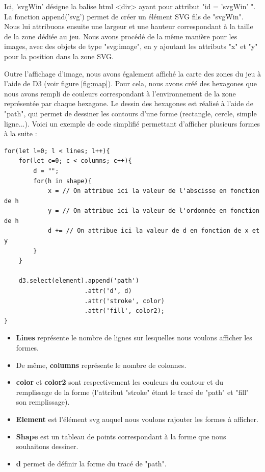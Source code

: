 \documentclass[12pt]{report}
\begin{document}
    Ici, 'svgWin' désigne la balise html \textless{}div\textgreater{} ayant pour attribut "id = 'svgWin' ". La fonction append('svg') permet de créer un élément SVG fils de "svgWin". Nous lui attribuons ensuite une largeur et une hauteur correspondant à la taille de la zone dédiée au jeu. Nous avons procédé de la même manière pour les images, avec des objets de type "svg:image", en y ajoutant les attributs "x" et "y" pour la position dans la zone SVG.

    Outre l'affichage d'image, nous avons également affiché la carte des zones du jeu à l'aide de D3 (voir figure \ref{fig:map}). Pour cela, nous avons créé des hexagones que nous avons rempli de couleurs correspondant à l'environnement de la zone représentée par chaque hexagone. Le dessin des hexagones est réalisé à l'aide de "path", qui permet de dessiner les contours d'une forme (rectangle, cercle, simple ligne...). Voici un exemple de code simplifié permettant d'afficher plusieurs formes à la suite :

	\begin{verbatim}
for(let l=0; l < lines; l++){
    for(let c=0; c < columns; c++){
        d = "";
        for(h in shape){
            x = // On attribue ici la valeur de l'abscisse en fonction de h
            y = // On attribue ici la valeur de l'ordonnée en fonction de h
            d += // On attribue ici la valeur de d en fonction de x et y
        }
    }

    d3.select(element).append('path')
                      .attr('d', d)
                      .attr('stroke', color)
                      .attr('fill', color2);
}
	\end{verbatim}

	\begin{itemize}
        	\item \textbf{Lines} représente le nombre de lignes sur lesquelles nous voulons afficher les formes.
        	\item De même, \textbf{columns} représente le nombre de colonnes. \item \textbf{color} et \textbf{color2} sont respectivement les couleurs du contour et du remplissage de la forme (l'attribut "stroke" étant le tracé de "path" et "fill" son remplissage). \item \textbf{Element} est l'élément svg auquel nous voulons rajouter les formes à afficher.
        	\item \textbf{Shape} est un tableau de points correspondant à la forme que nous souhaitons dessiner.
        	\item \textbf{d} permet de définir la forme du tracé de "path".
	\end{itemize}
\end{document}
